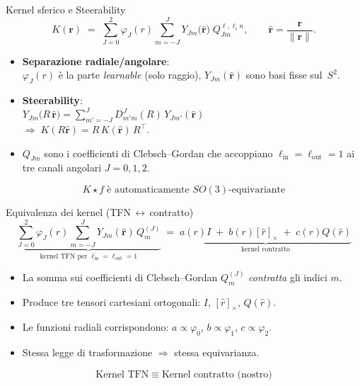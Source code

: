 \documentclass[aspectratio=32,8pt]{beamer}
\begin{document}
\begin{frame}[fragile]{Kernel sferico e Steerability}
\small
\[
  K(\mathbf r)
  \;=\;
  \sum_{J=0}^{2} \varphi_J(r)
  \sum_{m=-J}^{J}
  Y_{Jm}\!\bigl(\hat{\mathbf r}\bigr)\;
  Q_{Jm}^{\ell,\ell_in},
  \qquad
  \hat{\mathbf r}=\frac{\mathbf r}{\lVert\mathbf r\rVert}.
\]

\begin{itemize}
  \item \textbf{Separazione radiale/angolare}:\\[2pt]
        \(\varphi_J(r)\) è la parte \emph{learnable} (solo raggio),  
        \(Y_{Jm}(\hat{\mathbf r})\) sono basi fisse sul \(S^2\).
  \item \textbf{Steerability}:\\[2pt]
        \(Y_{Jm}\bigl(R\,\hat{\mathbf r}\bigr)
        =\displaystyle\sum_{m'=-J}^{J} D^{J}_{m'm}(R)\,Y_{Jm'}(\hat{\mathbf r})\)\\
        \(\Longrightarrow\;
        K(R\hat{\mathbf r}) = R\,K(\hat{\mathbf r})\,R^{\!\top}\).
  \item \(Q_{Jm}\) sono i coefficienti di Clebsch–Gordan che accoppiano
        \(\ell_{\text{in}}=\ell_{\text{out}}=1\) 
        ai tre canali angolari \(J=0,1,2\).
\end{itemize}

\[
  \boxed{\;K\star f \;\text{è automaticamente }SO(3)\text{-equivariante}\;}
\]
\end{frame}


\begin{frame}[fragile]{Equivalenza dei kernel (TFN\,$\leftrightarrow$\,contratto)}
\small
\[
\underbrace{\sum_{\scriptstyle J=0}^{2}\!\varphi_J(r)\sum_{m=-J}^{J}Y_{Jm}(\hat{\mathbf r})\,Q^{(J)}_{m}}_{\text{kernel TFN per }\ell_{\text{in}}=\ell_{\text{out}}=1}
\;=\;
\underbrace{a(r)I\; +\; b(r)[\hat r]_\times\; +\; c(r)Q(\hat r)}_{\text{kernel contratto}}
\]
\vspace{0.5em}
\begin{itemize}
  \item La somma sui coefficienti di Clebsch--Gordan $Q^{(J)}_{m}$ \emph{contratta} gli indici $m$.
  \item Produce tre tensori cartesiani ortogonali: $I$, $[\hat r]_\times$, $Q(\hat r)$.
  \item Le funzioni radiali corrispondono: $a\!\propto\!\varphi_0$, $b\!\propto\!\varphi_1$, $c\!\propto\!\varphi_2$.
  \item Stessa legge di trasformazione $\Rightarrow$ stessa equivarianza.
\end{itemize}
\vspace{-0.5em}
\[
\boxed{\text{Kernel TFN}\;\equiv\;\text{Kernel contratto (nostro)}}
\]
\end{frame}
\end{document}
